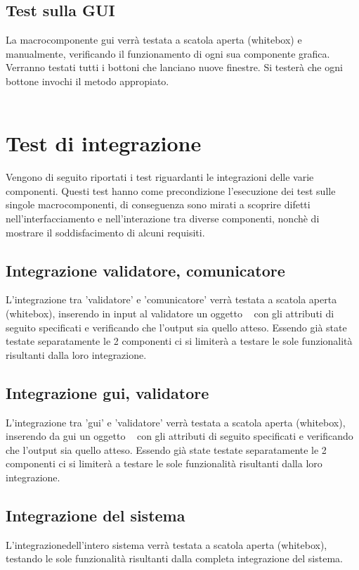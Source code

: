 \subsection{Test sulla GUI}
La macrocomponente gui verr\`a testata a scatola aperta (whitebox) e manualmente, verificando il funzionamento di ogni sua componente grafica. Verranno testati tutti i bottoni che lanciano nuove finestre. Si tester\`a che ogni bottone invochi il metodo appropiato.\\
\\

\section{Test di integrazione}
Vengono di seguito riportati i test riguardanti le integrazioni delle varie componenti. Questi test hanno come precondizione l'esecuzione dei test sulle singole macrocomponenti, di conseguenza sono mirati a scoprire difetti nell'interfacciamento e nell'interazione tra diverse componenti, nonch\`e di mostrare il soddisfacimento di alcuni requisiti.

\subsection{Integrazione validatore, comunicatore}
L'integrazione tra 'validatore' e 'comunicatore' verr\`a testata a scatola aperta (whitebox), inserendo in input al validatore un oggetto \textit{\br\ } con gli attributi di seguito specificati e verificando che l'output sia quello atteso. Essendo gi\`a state testate separatamente le 2 componenti ci si limiter\`a a testare le sole funzionalit\`a risultanti dalla loro integrazione.\\

\subsection{Integrazione gui, validatore}
L'integrazione tra 'gui' e 'validatore' verr\`a testata a scatola aperta (whitebox), inserendo da gui  un oggetto \textit{\br\ } con gli attributi di seguito specificati e verificando che l'output sia quello atteso. Essendo gi\`a state testate separatamente le 2 componenti ci si limiter\`a a testare le sole funzionalit\`a risultanti dalla loro integrazione.\\

\subsection{Integrazione del sistema}
L'integrazionedell'intero sistema verr\`a testata a scatola aperta (whitebox), testando le sole funzionalit\`a risultanti dalla completa integrazione del sistema.\\

